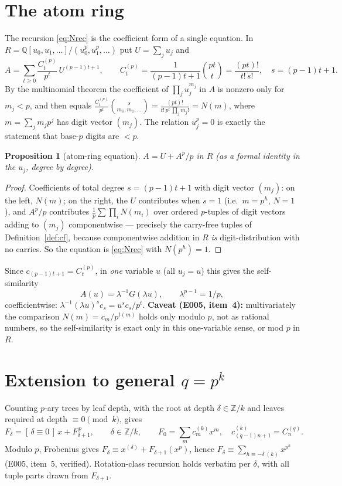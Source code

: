 \documentclass[11pt]{amsart}
\newtheorem{proposition}[theorem]{Proposition}
\theoremstyle{definition}
\theoremstyle{remark}
\newcommand{\Z}{\mathbb Z}
\newcommand{\Q}{\mathbb Q}
\newcommand{\Nn}{N}
\begin{document}
\section{The atom ring}\label{sec:atom}

The recursion \eqref{eq:Nrec} is the coefficient form of a single equation.
In $R=\Q[u_0,u_1,\dots]/(u_0^p,u_1^p,\dots)$ put $U=\sum_ju_j$ and
\[
  A=\sum_{t\ge0}\frac{C_t^{(p)}}{p^t}\,U^{(p-1)t+1},
  \qquad C_t^{(p)}=\frac1{(p-1)t+1}\binom{pt}{t}=\frac{(pt)!}{t!\,s!},
  \quad s=(p-1)t+1.
\]
By the multinomial theorem the coefficient of $\prod_ju_j^{m_j}$ in $A$ is
nonzero only for $m_j<p$, and then equals
$\frac{C_t^{(p)}}{p^t}\binom{s}{m_0,m_1,\dots}
=\frac{(pt)!}{t!\,p^t\,\prod_jm_j!}=\Nn(m)$, where $m=\sum_jm_jp^j$ has digit
vector $(m_j)$. The relation $u_j^p=0$ is exactly the statement that base-$p$
digits are $<p$.

\begin{proposition}[atom-ring equation]
$A=U+A^p/p$ in $R$ (as a formal identity in the $u_j$, degree by degree).
\end{proposition}
\begin{proof}
Coefficients of total degree $s=(p-1)t+1$ with digit vector $(m_j)$: on the
left, $\Nn(m)$; on the right, the $U$ contributes when $s=1$ (i.e.\ $m=p^h$,
$\Nn=1$), and $A^p/p$ contributes $\frac1p\sum\prod_i\Nn(m_i)$ over ordered
$p$-tuples of digit vectors adding to $(m_j)$ componentwise --- precisely the
carry-free tuples of Definition~\ref{def:cf}, because componentwise addition
in $R$ \emph{is} digit-distribution with no carries. So the equation is
\eqref{eq:Nrec} with $\Nn(p^h)=1$.
\end{proof}

Since $c_{(p-1)t+1}=C_t^{(p)}$, in \emph{one} variable $u$ (all $u_j=u$) this
gives the self-similarity
\[
  A(u)=\lambda^{-1}G(\lambda u),\qquad\lambda^{p-1}=1/p,
\]
coefficientwise: $\lambda^{-1}(\lambda u)^s c_s=u^s c_s/p^t$.
\textbf{Caveat (E005, item~4):} multivariately the comparison
$\Nn(m)=c_m/p^{t(m)}$ holds only modulo $p$, not as rational numbers, so the
self-similarity is exact only in this one-variable sense, or mod $p$ in $R$.

\section{Extension to general $q=p^k$}\label{sec:k}

Counting $p$-ary trees by leaf depth, with the root at depth $\delta\in\Z/k$
and leaves required at depth $\equiv0\pmod k$, gives
\[
  F_\delta=[\,\delta\equiv0\,]\,x+F_{\delta+1}^{\,p},
  \qquad\delta\in\Z/k,\qquad
  F_0=\sum_m c_m^{(k)}x^m,\quad c_{(q-1)n+1}^{(k)}=C_n^{(q)}.
\]
Modulo $p$, Frobenius gives $F_\delta\equiv x^{(\delta)}+F_{\delta+1}(x^p)$,
hence $F_\delta\equiv\sum_{h\equiv-\delta\ (k)}x^{p^h}$ (E005, item~5,
verified). Rotation-class recursion holds verbatim per $\delta$, with all
tuple parts drawn from $F_{\delta+1}$.
\end{document}
